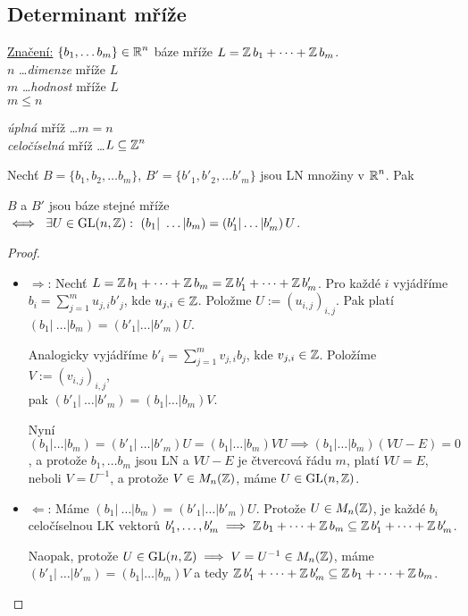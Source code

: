 \subsection{Determinant mříže}
\underline{Značení:}
$\{b_1, \dots b_m\} \in \operatorname{\mathbb{R}}^n$ báze mříže $L = \operatorname{\mathbb{Z}} b_1 + \dots + \operatorname{\mathbb{Z}} b_m$.\\
$n$ \ldots \emph{dimenze} mříže $L$\\
$m$ \ldots \emph{hodnost} mříže $L$\\
$m \leq n$

\emph{úplná} mříž \ldots $m = n$\\
\emph{celočíselná} mříž \ldots $L \subseteq \operatorname{\mathbb{Z}}^n$ 

\begin{claim}
Nechť $B = \{b_1, b_2, \dots b_m\}$, $B' = \{b'_1, b'_2, \dots b'_m\}$ jsou LN množiny v $\operatorname{\mathbb{R}}^n$. Pak

$B$ a $B'$ jsou báze stejné mříže $\iff \ \exists U \in \operatorname{GL}(n,\operatorname{\mathbb{Z}}): \ \left( b_1| \ \dots | b_m\right) = \left( b'_1 | \dots | b'_m \right)U$.
\end{claim}
\begin{proof}
\begin{itemize}[label={}]
\phantom{}
    \item $\Rightarrow$: Nechť $L = \operatorname{\mathbb{Z}} b_1+\dots+\operatorname{\mathbb{Z}} b_m = \operatorname{\mathbb{Z}} b'_1 + \dots + \operatorname{\mathbb{Z}} b'_m$. Pro každé $i$ vyjádříme $b_i = \sum_{j=1}^m u_{j,i}b'_j$, kde $u_{j,i} \in \operatorname{\mathbb{Z}}$. Položme $U := \left( u_{i,j} \right)_{i,j}$. Pak platí $\left( b_1| \ \dots | b_m\right) = \left( b'_1 | \dots | b'_m \right)U$.
    
    Analogicky vyjádříme $b'_i = \sum_{j=1}^m v_{j,i}b_j$, kde $v_{j,i} \in \operatorname{\mathbb{Z}}$. Položíme $V := \left( v_{i,j}\right)_{i,j}$,\\pak $\left( b'_1| \ \dots | b'_m\right) = \left( b_1 | \dots | b_m \right)V$.
    
    Nyní $\left( b_1 | \dots | b_m \right) = \left( b'_1| \ \dots | b'_m\right)U = \left( b_1 | \dots | b_m \right)VU \implies \left( b_1 | \dots | b_m \right)\left(VU-E\right) = 0$, a protože $b_1,\dots b_m$ jsou LN a $VU - E$ je čtvercová řádu $m$, platí $VU = E$, neboli $V=U^{-1}$, a protože $V \in M_n(\operatorname{\mathbb{Z}})$, máme $U \in \operatorname{GL}(n,\operatorname{\mathbb{Z}})$.
    
    \item $\Leftarrow$: Máme $\left( b_1| \ \dots | b_m\right) = \left( b'_1 | \dots | b'_m \right)U$. Protože $U \in M_n(\operatorname{\mathbb{Z}})$, je každé $b_i$ celočíselnou LK vektorů $b'_1,\dots,b'_m \implies \operatorname{\mathbb{Z}} b_1 + \dots + \operatorname{\mathbb{Z}} b_m \subseteq \operatorname{\mathbb{Z}} b'_1 + \dots + \operatorname{\mathbb{Z}} b'_m$.
    
    Naopak, protože $U \in \operatorname{GL}(n,\operatorname{\mathbb{Z}}) \implies V = U^{-1} \in M_n(\operatorname{\mathbb{Z}})$, máme $\left( b'_1| \ \dots | b'_m\right) = \left( b_1 | \dots | b_m \right)V$ a tedy $\operatorname{\mathbb{Z}} b'_1 + \dots + \operatorname{\mathbb{Z}} b'_m \subseteq \operatorname{\mathbb{Z}} b_1 + \dots + \operatorname{\mathbb{Z}} b_m$.
\end{itemize}
\end{proof}

